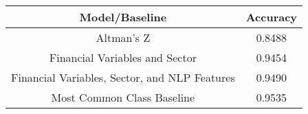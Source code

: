 \footnotesize
\begin{tabular}{cc}
\toprule
Model/Baseline & Accuracy \\
\midrule
Altman's Z & 0.8488 \\
Financial Variables and Sector & 0.9454 \\
Financial Variables, Sector, and NLP Features & 0.9490 \\
Most Common Class Baseline & 0.9535 \\
\bottomrule
\end{tabular}

\normalsize
